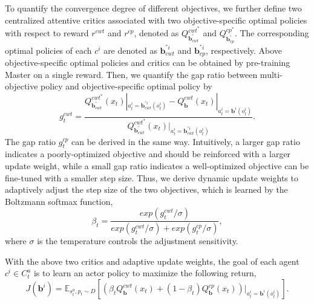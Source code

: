 \documentclass[sigconf]{acmart}
\newcommand{\eat}[1]{}
\newcommand{\stddpg}{{\sc Master}\xspace}
\newcommand{\ie}{\emph{i.e.},\xspace}
\begin{document}
To quantify the convergence degree of different objectives, we further define two centralized attentive critics associated with two objective-specific optimal policies with respect to reward $r^{cwt}$ and $r^{cp}$, denoted as $Q_{\bm{b}_{cwt}^{^*}}^{cwt^*}$ and $Q_{\bm{b}_{cp}^{^*}}^{cp^*}$. 
The corresponding optimal policies of each $c^i$ are denoted as $\bm{b}_{cwt}^{^*i}$ and $\bm{b}_{cp}^{^*i}$, respectively.
Above objective-specific optimal policies and critics can be obtained by pre-training \stddpg on a single reward. 
Then, we quantify the gap ratio between multi-objective policy and objective-specific optimal policy by 
\begin{equation}\label{equ:gap_ratio}
	g_t^{cwt} = \frac{Q_{\bm{b}_{cwt}^{^*}}^{cwt^*}(x_t)|_{a_{t}^i=\bm{b}_{cwt}^{^*i}(o_{t}^i)} - Q_{\bm{b}}^{cwt}(x_t)|_{a_{t}^i=\bm{b}^{i}(o_{t}^i)}} {Q_{\bm{b}_{cwt}^{^*}}^{cwt^*}(x_t)|_{a_{t}^i=\bm{b}_{cwt}^{^*i}(o_{t}^i)}}.
\end{equation}
The gap ratio $g_t^{cp}$ can be derived in the same way.
Intuitively, a larger gap ratio indicates a poorly-optimized objective and should be reinforced with a larger update weight, while a small gap ratio indicates a well-optimized objective can be fine-tuned with a smaller step size. 
Thus, we derive dynamic update weights to adaptively adjust the step size of the two objectives, which is learned by the Boltzmann softmax function,
\begin{equation}\label{equ:update_weight}
    \beta_t = \frac{exp(g_t^{cwt}/\sigma)}{exp(g_t^{cwt}/\sigma) + exp(g_t^{cp}/\sigma)},
\end{equation}
where $\sigma$ is the temperature controls the adjustment sensitivity.

With the above two critics and adaptive update weights, the goal of each agent $c^i \in C_t^a$ is to learn an actor policy to maximize the following return,
\begin{equation}
J(\bm{b}^i)=\mathbb{E}_{s^a_t,p_t \sim D}\left[ \left(\beta_t Q_{\bm{b}}^{cwt}(x_t) + (1-\beta_t) Q_{\bm{b}}^{cp}(x_t)\right)|_{a_t^i=\bm{b}^i(o_t^i)}\right].
\end{equation}
\eat{where $\beta_t$ is the dynamic weight to adjust the optimized strength for objectives.}

\eat{Intuitively, the objective with less expected return~(\ie $Q_{\bm{b}}$) means it's
in poor-optimized and should be reinforced by a larger weight, while the well-optimized objective should be fine-turned carefully with a smaller weight. 
Thus, we leverage the boltzmann machines to quantify the weights by regarding the expected return as energy
\begin{equation}
\beta_t = \frac{exp(-Q_{\bm{b}}^{cwt}(x_t)/\sigma)}{exp(-Q_{\bm{b}}^{cwt}(x_t)/\sigma) + exp(-Q_{\bm{b}}^{cp}(x_t)/\sigma)}
\end{equation}
where $\sigma$ denotes temperature hyper-parameter to control the degree of reinforcement.}
\end{document}
